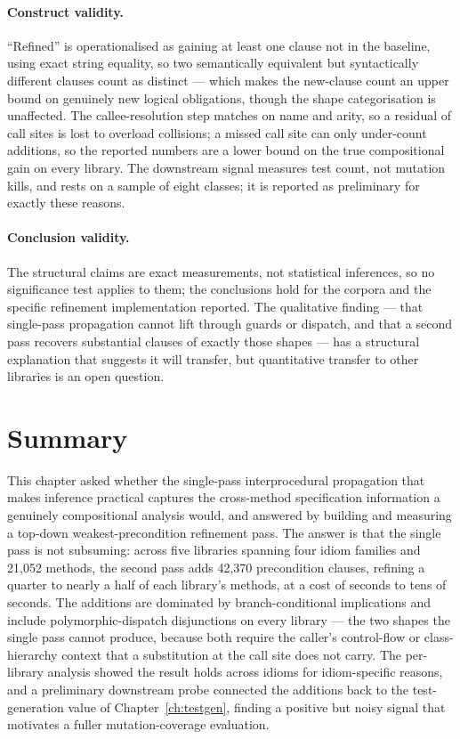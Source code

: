 \paragraph{Construct validity.} ``Refined'' is operationalised as gaining at
least one clause not in the baseline, using exact string equality, so two
semantically equivalent but syntactically different clauses count as distinct ---
which makes the new-clause count an upper bound on genuinely new logical
obligations, though the shape categorisation is unaffected. The callee-resolution
step matches on name and arity, so a residual of call sites is lost to overload
collisions; a missed call site can only under-count additions, so the reported
numbers are a lower bound on the true compositional gain on every library. The
downstream signal measures test count, not mutation kills, and rests on a sample
of eight classes; it is reported as preliminary for exactly these reasons.

\paragraph{Conclusion validity.} The structural claims are exact measurements,
not statistical inferences, so no significance test applies to them; the
conclusions hold for the corpora and the specific refinement implementation
reported. The qualitative finding --- that single-pass propagation cannot lift
through guards or dispatch, and that a second pass recovers substantial clauses
of exactly those shapes --- has a structural explanation that suggests it will
transfer, but quantitative transfer to other libraries is an open question.

\section{Summary}
\label{sec:comp-summary}

This chapter asked whether the single-pass interprocedural propagation that makes
inference practical captures the cross-method specification information a genuinely
compositional analysis would, and answered by building and measuring a top-down
weakest-precondition refinement pass. The answer is that the single pass is not
subsuming: across five libraries spanning four idiom families and 21{,}052 methods,
the second pass adds 42{,}370 precondition clauses, refining a quarter to nearly a
half of each library's methods, at a cost of seconds to tens of seconds. The
additions are dominated by branch-conditional implications and include
polymorphic-dispatch disjunctions on every library --- the two shapes the single
pass cannot produce, because both require the caller's control-flow or
class-hierarchy context that a substitution at the call site does not carry. The
per-library analysis showed the result holds across idioms for idiom-specific
reasons, and a preliminary downstream probe connected the additions back to the
test-generation value of Chapter~\ref{ch:testgen}, finding a positive but noisy
signal that motivates a fuller mutation-coverage evaluation.

